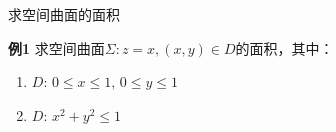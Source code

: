 \begin{frame}{求空间曲面的面积}
	\linespread{1.2}
	\begin{exampleblock}{{\bf 例1}\hfill}
		求空间曲面$\Sigma:z=x,(x,y)\in D$的面积，其中：
		\begin{enumerate}
		  \item $D:\,0\leq x\leq 1,\,0\leq y\leq 1$
		  \item $D:\,x^2+y^2\leq 1$
		\end{enumerate}
	\end{exampleblock}\pause 
	\begin{columns}
			\begin{center}
			\end{center}
		\pause 
			\begin{center}
			\end{center}
	\end{columns}
\end{frame}

